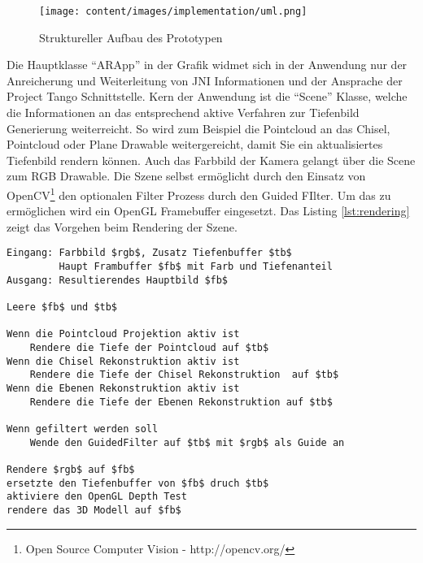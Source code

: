 \begin{figure}[h]
  \centering
	\texttt{[image: content/images/implementation/uml.png]} 
  \caption{Struktureller Aufbau des Prototypen}
  \label{fig:structure}
\end{figure}

Die Hauptklasse \enquote{ARApp} in der Grafik widmet sich in der Anwendung nur der Anreicherung und Weiterleitung von JNI Informationen und der Ansprache der Project Tango Schnittstelle. Kern der Anwendung ist die \enquote{Scene} Klasse, welche die Informationen an das entsprechend aktive Verfahren zur Tiefenbild Generierung weiterreicht. So wird zum Beispiel die Pointcloud an das Chisel, Pointcloud oder Plane Drawable weitergereicht, damit Sie ein aktualisiertes Tiefenbild rendern können. Auch das Farbbild der Kamera gelangt über die Scene zum RGB Drawable. Die Szene selbst ermöglicht durch den Einsatz von OpenCV\footnote{Open Source Computer Vision - http://opencv.org/} den optionalen Filter Prozess durch den Guided FIlter. Um das zu ermöglichen wird ein OpenGL Framebuffer eingesetzt. Das Listing \ref{lst:rendering} zeigt das Vorgehen beim Rendering der Szene.\\

\begin{lstlisting}[mathescape,caption=Rendering der Szene, label=lst:rendering]
Eingang: Farbbild $rgb$, Zusatz Tiefenbuffer $tb$
         Haupt Frambuffer $fb$ mit Farb und Tiefenanteil
Ausgang: Resultierendes Hauptbild $fb$

Leere $fb$ und $tb$

Wenn die Pointcloud Projektion aktiv ist
    Rendere die Tiefe der Pointcloud auf $tb$
Wenn die Chisel Rekonstruktion aktiv ist
    Rendere die Tiefe der Chisel Rekonstruktion  auf $tb$
Wenn die Ebenen Rekonstruktion aktiv ist
    Rendere die Tiefe der Ebenen Rekonstruktion auf $tb$
    
Wenn gefiltert werden soll
    Wende den GuidedFilter auf $tb$ mit $rgb$ als Guide an
        
Rendere $rgb$ auf $fb$ 
ersetzte den Tiefenbuffer von $fb$ druch $tb$
aktiviere den OpenGL Depth Test
rendere das 3D Modell auf $fb$
\end{lstlisting}
